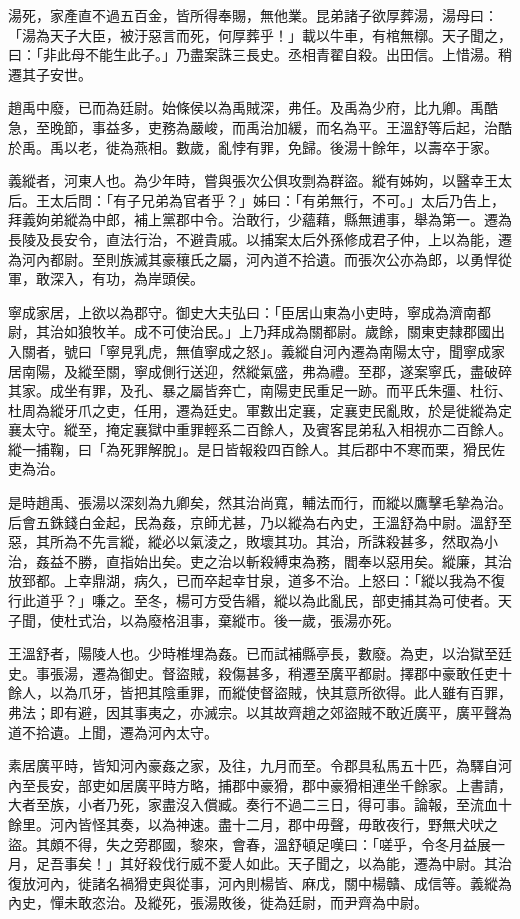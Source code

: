 \begin{pinyinscope}
湯死，家產直不過五百金，皆所得奉賜，無他業。昆弟諸子欲厚葬湯，湯母曰：「湯為天子大臣，被汙惡言而死，何厚葬乎！」載以牛車，有棺無槨。天子聞之，曰：「非此母不能生此子。」乃盡案誅三長史。丞相青翟自殺。出田信。上惜湯。稍遷其子安世。

趙禹中廢，已而為廷尉。始條侯以為禹賊深，弗任。及禹為少府，比九卿。禹酷急，至晚節，事益多，吏務為嚴峻，而禹治加緩，而名為平。王溫舒等后起，治酷於禹。禹以老，徙為燕相。數歲，亂悖有罪，免歸。後湯十餘年，以壽卒于家。

義縱者，河東人也。為少年時，嘗與張次公俱攻剽為群盜。縱有姊姁，以醫幸王太后。王太后問：「有子兄弟為官者乎？」姊曰：「有弟無行，不可。」太后乃告上，拜義姁弟縱為中郎，補上黨郡中令。治敢行，少蘊藉，縣無逋事，舉為第一。遷為長陵及長安令，直法行治，不避貴戚。以捕案太后外孫修成君子仲，上以為能，遷為河內都尉。至則族滅其豪穰氏之屬，河內道不拾遺。而張次公亦為郎，以勇悍從軍，敢深入，有功，為岸頭侯。

寧成家居，上欲以為郡守。御史大夫弘曰：「臣居山東為小吏時，寧成為濟南都尉，其治如狼牧羊。成不可使治民。」上乃拜成為關都尉。歲餘，關東吏隸郡國出入關者，號曰「寧見乳虎，無值寧成之怒」。義縱自河內遷為南陽太守，聞寧成家居南陽，及縱至關，寧成側行送迎，然縱氣盛，弗為禮。至郡，遂案寧氏，盡破碎其家。成坐有罪，及孔、暴之屬皆奔亡，南陽吏民重足一跡。而平氏朱彊、杜衍、杜周為縱牙爪之吏，任用，遷為廷史。軍數出定襄，定襄吏民亂敗，於是徙縱為定襄太守。縱至，掩定襄獄中重罪輕系二百餘人，及賓客昆弟私入相視亦二百餘人。縱一捕鞠，曰「為死罪解脫」。是日皆報殺四百餘人。其后郡中不寒而栗，猾民佐吏為治。

是時趙禹、張湯以深刻為九卿矣，然其治尚寬，輔法而行，而縱以鷹擊毛摯為治。后會五銖錢白金起，民為姦，京師尤甚，乃以縱為右內史，王溫舒為中尉。溫舒至惡，其所為不先言縱，縱必以氣淩之，敗壞其功。其治，所誅殺甚多，然取為小治，姦益不勝，直指始出矣。吏之治以斬殺縛束為務，閻奉以惡用矣。縱廉，其治放郅都。上幸鼎湖，病久，已而卒起幸甘泉，道多不治。上怒曰：「縱以我為不復行此道乎？」嗛之。至冬，楊可方受告緡，縱以為此亂民，部吏捕其為可使者。天子聞，使杜式治，以為廢格沮事，棄縱市。後一歲，張湯亦死。

王溫舒者，陽陵人也。少時椎埋為姦。已而試補縣亭長，數廢。為吏，以治獄至廷史。事張湯，遷為御史。督盜賊，殺傷甚多，稍遷至廣平都尉。擇郡中豪敢任吏十餘人，以為爪牙，皆把其陰重罪，而縱使督盜賊，快其意所欲得。此人雖有百罪，弗法；即有避，因其事夷之，亦滅宗。以其故齊趙之郊盜賊不敢近廣平，廣平聲為道不拾遺。上聞，遷為河內太守。

素居廣平時，皆知河內豪姦之家，及往，九月而至。令郡具私馬五十匹，為驛自河內至長安，部吏如居廣平時方略，捕郡中豪猾，郡中豪猾相連坐千餘家。上書請，大者至族，小者乃死，家盡沒入償臧。奏行不過二三日，得可事。論報，至流血十餘里。河內皆怪其奏，以為神速。盡十二月，郡中毋聲，毋敢夜行，野無犬吠之盜。其頗不得，失之旁郡國，黎來，會春，溫舒頓足嘆曰：「嗟乎，令冬月益展一月，足吾事矣！」其好殺伐行威不愛人如此。天子聞之，以為能，遷為中尉。其治復放河內，徙諸名禍猾吏與從事，河內則楊皆、麻戊，關中楊贛、成信等。義縱為內史，憚未敢恣治。及縱死，張湯敗後，徙為廷尉，而尹齊為中尉。


\end{pinyinscope}
